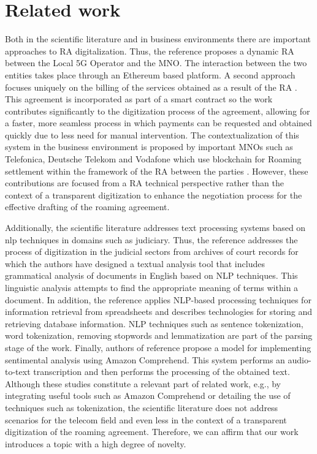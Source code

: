 \documentclass[conference]{style/IEEEtran}
\begin{document}
\section{Related work}

Both in the scientific literature and in business environments there are important approaches to RA digitalization. Thus, the reference \cite{b5} proposes a dynamic RA between the Local 5G Operator and the MNO. The interaction between the two entities takes place through an Ethereum based platform. A second approach focuses uniquely on the billing of the services obtained as a result of the RA \cite{b6}. This agreement is incorporated as part of a smart contract so the work contributes significantly to the digitization process of the agreement, allowing for a faster, more seamless process in which payments can be requested and obtained quickly due to less need for manual intervention. The contextualization of this system in the business environment is proposed by important MNOs such as Telefonica, Deutsche Telekom and Vodafone which use blockchain for Roaming settlement within the framework of the RA between the parties \cite{b7}. However, these contributions are focused from a RA technical perspective rather than the context of a transparent digitization to enhance the negotiation process for the effective drafting of the roaming agreement. 

Additionally, the scientific literature addresses text processing systems based on nlp techniques in domains such as judiciary. Thus, the reference \cite{b9} addresses the process of digitization in the judicial sectors from archives of court records for which the authors have designed a textual analysis tool that includes grammatical analysis of documents in English based on NLP techniques. This linguistic analysis attempts to find the appropriate meaning of terms within a document. In addition, the reference \cite{b8} applies NLP-based processing techniques for information retrieval from spreadsheets and describes technologies for storing and retrieving database information. NLP techniques such as sentence tokenization, word tokenization, removing stopwords and lemmatization are part of the parsing stage of the work. Finally, authors of reference \cite{b10} propose a model for implementing sentimental analysis using Amazon Comprehend. This system performs an audio-to-text transcription and then performs the processing of the obtained text. Although these studies  constitute a relevant part of related work, e.g., by integrating useful tools such as Amazon Comprehend or detailing the use of techniques such as tokenization, the scientific literature does not address scenarios for the telecom field and even less in the context of a transparent digitization of the roaming agreement. Therefore, we can affirm that our work introduces a topic with a high degree of novelty.
\end{document}
